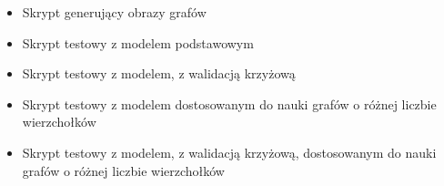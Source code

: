 
\begin{itemize}[label=-,labelsep=0.4cm,leftmargin=0.6cm]
    \item Skrypt generujący obrazy grafów
    \item Skrypt testowy z modelem podstawowym
    \item Skrypt testowy z modelem, z walidacją krzyżową
    \item Skrypt testowy z modelem dostosowanym do nauki grafów o różnej liczbie wierzchołków
    \item Skrypt testowy z modelem, z walidacją krzyżową, dostosowanym do nauki grafów o różnej liczbie wierzchołków
\end{itemize}